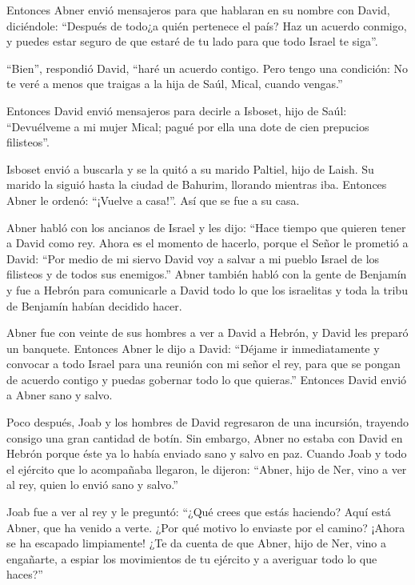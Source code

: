  Entonces Abner envió mensajeros para que hablaran en su
nombre con David, diciéndole: ``Después de todo¿a quién pertenece el
país? Haz un acuerdo conmigo, y puedes estar seguro de que estaré de tu
lado para que todo Israel te siga''.

 ``Bien'', respondió David, ``haré un acuerdo contigo. Pero
tengo una condición: No te veré a menos que traigas a la hija de Saúl,
Mical, cuando vengas.''

 Entonces David envió mensajeros para decirle a Isboset,
hijo de Saúl: ``Devuélveme a mi mujer Mical; pagué por ella una dote de
cien prepucios filisteos''.

 Isboset envió a buscarla y se la quitó a su marido
Paltiel, hijo de Laish.  Su marido la siguió hasta la
ciudad de Bahurim, llorando mientras iba. Entonces Abner le ordenó:
``¡Vuelve a casa!''. Así que se fue a su casa.

 Abner habló con los ancianos de Israel y les dijo: ``Hace
tiempo que quieren tener a David como rey.  Ahora es el
momento de hacerlo, porque el Señor le prometió a David: ``Por medio de
mi siervo David voy a salvar a mi pueblo Israel de los filisteos y de
todos sus enemigos.''  Abner también habló con la gente de
Benjamín y fue a Hebrón para comunicarle a David todo lo que los
israelitas y toda la tribu de Benjamín habían decidido hacer.

 Abner fue con veinte de sus hombres a ver a David a
Hebrón, y David les preparó un banquete.  Entonces Abner le
dijo a David: ``Déjame ir inmediatamente y convocar a todo Israel para
una reunión con mi señor el rey, para que se pongan de acuerdo contigo y
puedas gobernar todo lo que quieras.'' Entonces David envió a Abner sano
y salvo.

 Poco después, Joab y los hombres de David regresaron de
una incursión, trayendo consigo una gran cantidad de botín. Sin embargo,
Abner no estaba con David en Hebrón porque éste ya lo había enviado sano
y salvo en paz.  Cuando Joab y todo el ejército que lo
acompañaba llegaron, le dijeron: ``Abner, hijo de Ner, vino a ver al
rey, quien lo envió sano y salvo.''

 Joab fue a ver al rey y le preguntó: ``¿Qué crees que
estás haciendo? Aquí está Abner, que ha venido a verte. ¿Por qué motivo
lo enviaste por el camino? ¡Ahora se ha escapado limpiamente!
 ¿Te da cuenta de que Abner, hijo de Ner, vino a engañarte,
a espiar los movimientos de tu ejército y a averiguar todo lo que
haces?''

